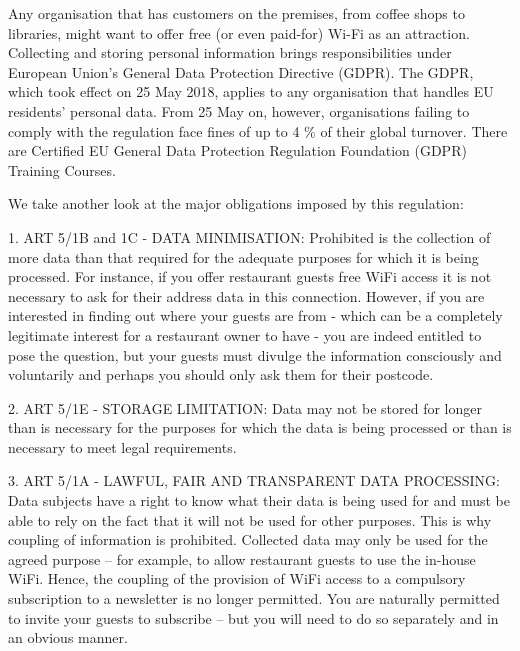 \documentclass[12pt]{amsart}
\begin{document}
\begin{multicols}{2}
Any organisation that has customers on the premises,
from coffee shops to libraries, might want to offer free (or even
paid-for) Wi-Fi as an attraction. Collecting and storing personal
information brings responsibilities under European Union’s General
Data Protection Directive (GDPR). The GDPR\cite{gdpr16}, which took
effect on 25 May 2018, applies to any organisation that handles EU
residents’ personal data. From 25 May on, however, organisations
failing to comply with the regulation face fines of up to 4 \% of
their global turnover. There are Certified EU General Data Protection
Regulation Foundation (GDPR) Training Courses.

\vspace{0.35cm}

We take another look at the major obligations imposed by this
regulation\cite{tata17}:


\vspace{0.35cm}
1. ART 5/1B and 1C - DATA MINIMISATION:
Prohibited is the collection of more data than that required for the
adequate purposes for which it is being processed. For instance, if
you offer restaurant guests free WiFi access it is not necessary to
ask for their address data in this connection. However, if you are
interested in finding out where your guests are from - which can be a
completely legitimate interest for a restaurant owner to have - you
are indeed entitled to pose the question, but your guests must divulge
the information consciously and voluntarily and perhaps you should
only ask them for their postcode.

\vspace{0.35cm}
2. ART 5/1E - STORAGE LIMITATION:
Data may not be stored for longer than is necessary for the purposes
for which the data is being processed or than is necessary to meet
legal requirements.

\vspace{0.35cm}
3. ART 5/1A - LAWFUL, FAIR AND TRANSPARENT DATA
PROCESSING: Data subjects have a right to know what their data is
being used for and must be able to rely on the fact that it will not
be used for other purposes. This is why coupling of information is
prohibited. Collected data may only be used for the agreed purpose –
for example, to allow restaurant guests to use the in-house
WiFi. Hence, the coupling of the provision of WiFi access to a
compulsory subscription to a newsletter is no longer permitted. You
are naturally permitted to invite your guests to subscribe – but you
will need to do so separately and in an obvious manner.


\end{multicols}
\end{document}
